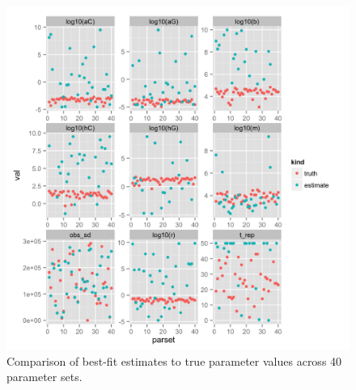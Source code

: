 \documentclass[12pt,reqno,final,pdftex]{amsart}\usepackage[]{graphicx}\usepackage[]{color}
\newenvironment{knitrout}{}{} %
\theoremstyle{plain}
\numberwithin{equation}{part}
\begin{document}
\begin{knitrout}\scriptsize
{}\color{fgcolor}\begin{figure}

\includegraphics[width=\linewidth]{figure/forty-1} \hfill{}

\caption[Comparison of best-fit estimates to true parameter values across 40 parameter sets]{Comparison of best-fit estimates to true parameter values across 40 parameter sets.}\label{fig:forty}
\end{figure}


\end{knitrout}
\end{document}

